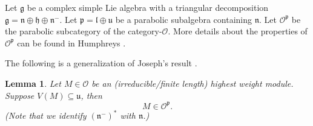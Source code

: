 \documentclass{amsart}[12pt]
\newtheorem{Lem}{Lemma}[section]
\def\fnn{\mathfrak{n}}
\def\fuu{\mathfrak{u}}
\def\fll{\mathfrak{l}}
\renewcommand{\subset}{\subseteq}
\numberwithin{equation}{section}
\begin{document}
Let $\mathfrak{g}$ be a complex simple Lie algebra with a triangular decomposition $\mathfrak{g}=\mathfrak{n}\oplus \mathfrak{h} \oplus \mathfrak{n}^-$. Let $\mathfrak{p} = \fll\oplus \fuu$ be a parabolic subalgebra containing $\fnn$.
Let $\mathscr{O}^{\mathfrak{p}}$ be the parabolic subcategory of the category-$\mathscr{O}$. More details about the properties of $\mathscr{O}^{\mathfrak{p}}$ can be found in Humphreys \cite{Hum}.



The following is a generalization of Joseph's result \cite[Lemma 6.1]{Jo84}.
\begin{Lem}\label{ma}
	Let $M\in \mathscr{O}$ be an (irreducible/finite length) highest weight module.
	Suppose $V(M)\subset \fuu$, then
	\[
	M\in \mathscr{O}^{\mathfrak{p}}.
	\]
	(Note that we identify $(\fnn^-)^*$ with $\fnn$.)
\end{Lem}
\end{document}
